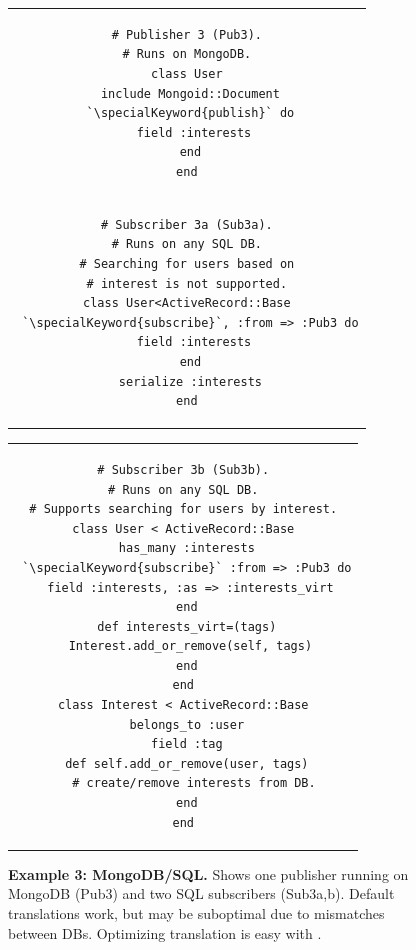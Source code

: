 \begin{figure}[t]
\begin{tabular}{c}
\begin{minipage}{.19\textwidth}
\vspace{-7pt}
\begin{lstlisting}[xleftmargin=1pt,framexleftmargin=1pt]
# Publisher 3 (Pub3).
# Runs on MongoDB.
class User
 include Mongoid::Document
 `\specialKeyword{publish}` do
  field :interests
 end
end
\end{lstlisting}
\end{minipage}\vspace{-8pt}\\
\begin{minipage}{.19\textwidth}
\begin{lstlisting}[xleftmargin=1pt,framexleftmargin=1pt]
# Subscriber 3a (Sub3a).
# Runs on any SQL DB.
# Searching for users based on
# interest is not supported.
class User<ActiveRecord::Base
 `\specialKeyword{subscribe}`, :from => :Pub3 do
  field :interests
 end
 serialize :interests
end
\end{lstlisting}
\end{minipage}\vspace{-8pt}\hfill
\end{tabular}
\begin{tabular}{c}
\begin{minipage}{.24\textwidth}
\begin{lstlisting}[xleftmargin=1pt,framexleftmargin=1pt]
# Subscriber 3b (Sub3b).
# Runs on any SQL DB.
# Supports searching for users by interest.
class User < ActiveRecord::Base
 has_many :interests
 `\specialKeyword{subscribe}` :from => :Pub3 do
  field :interests, :as => :interests_virt
 end
 def interests_virt=(tags)
  Interest.add_or_remove(self, tags)
 end
end
class Interest < ActiveRecord::Base
 belongs_to :user
 field :tag
 def self.add_or_remove(user, tags)
   # create/remove interests from DB.
 end
end
\end{lstlisting}
\end{minipage}
\end{tabular}
\vspace{-6pt}
\caption{{\bf Example 3: MongoDB/SQL.}
Shows one publisher running on MongoDB (Pub3) and two SQL subscribers
(Sub3a,b).  Default translations work, but may be suboptimal due to
mismatches between DBs.  Optimizing translation is easy with \synapse.
}
\label{synapse:fig:mongo-sql}
\vspace{-6pt}
\end{figure}

